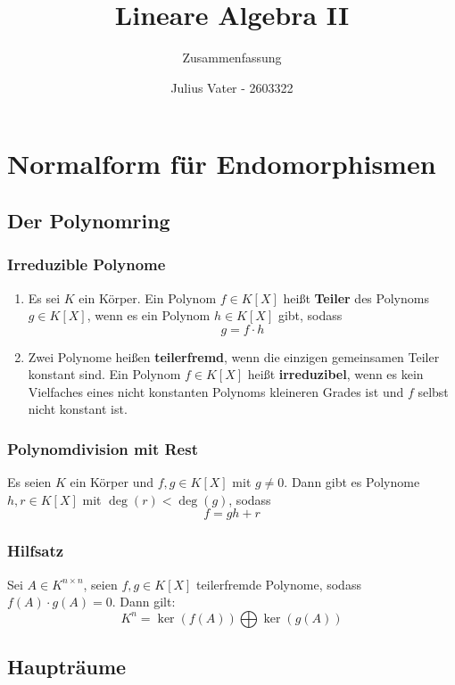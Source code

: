 \documentclass{kit}
\author{Julius Vater - 2603322}
\title{Lineare Algebra II}
\subtitle{Zusammenfassung}
\begin{document}
\maketitle
\setcounter{section}{8}
\section{Normalform für Endomorphismen}
  \subsection{Der Polynomring}
    \subsubsection{Irreduzible Polynome}
      \begin{enumerate}
        \item Es sei $K$ ein Körper. Ein Polynom $f\in K[X]$ heißt \textbf{Teiler} des Polynoms $g\in K[X]$, wenn es ein
          Polynom $h\in K[X]$ gibt, sodass
          $$g=f\cdot h$$
        \item Zwei Polynome heißen \textbf{teilerfremd}, wenn die einzigen gemeinsamen Teiler konstant sind.
          Ein Polynom $f\in K[X]$ heißt \textbf{irreduzibel}, wenn es kein Vielfaches eines nicht konstanten Polynoms
          kleineren Grades ist und $f$ selbst nicht konstant ist.
      \end{enumerate}
    \subsubsection{Polynomdivision mit Rest}
      Es seien $K$ ein Körper und $f,g\in K[X]$ mit $g\neq0$. Dann gibt es Polynome $h,r\in K[X]$ mit $\deg(r)<\deg(g)$,
      sodass
      $$f=gh+r$$
    \subsubsection{Hilfsatz}
      Sei $A\in K^{n\times n}$, seien $f,g\in K[X]$ teilerfremde Polynome, sodass $f(A)\cdot g(A)=0$. Dann gilt:
      $$K^n=\ker(f(A))\bigoplus\ker(g(A))$$
  \subsection{Haupträume}
\end{document}
